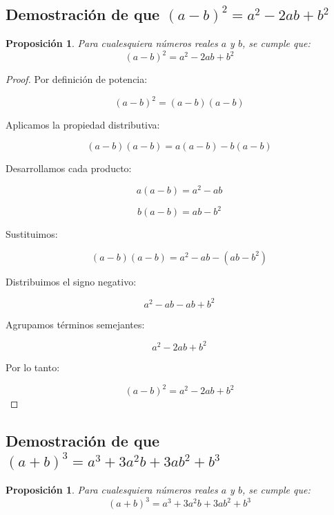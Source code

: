 \documentclass[12pt,final]{report}
\theoremstyle{plain}
\newtheorem{proposition}[theorem]{Proposición}
\theoremstyle{definition}
\begin{document}
\newpage

\subsection{Demostración de que $(a-b)^2=a^2-2ab+b^2$}

\begin{proposition}
Para cualesquiera números reales $a$ y $b$, se cumple que:
\[
(a-b)^2=a^2-2ab+b^2
\]
\end{proposition}

\begin{proof}

Por definición de potencia:

\[
(a-b)^2=(a-b)(a-b)
\]

Aplicamos la propiedad distributiva:

\[
(a-b)(a-b)=a(a-b)-b(a-b)
\]

Desarrollamos cada producto:

\[
a(a-b)=a^2-ab
\]

\[
b(a-b)=ab-b^2
\]

Sustituimos:

\[
(a-b)(a-b)=a^2-ab-(ab-b^2)
\]

Distribuimos el signo negativo:

\[
a^2-ab-ab+b^2
\]

Agrupamos términos semejantes:

\[
a^2-2ab+b^2
\]

Por lo tanto:

\[
(a-b)^2=a^2-2ab+b^2
\]

\end{proof}

\newpage


\subsection{Demostración de que $(a+b)^3=a^3+3a^2b+3ab^2+b^3$}

\begin{proposition}
Para cualesquiera números reales $a$ y $b$, se cumple que:
\[
(a+b)^3=a^3+3a^2b+3ab^2+b^3
\]
\end{proposition}
\end{document}
